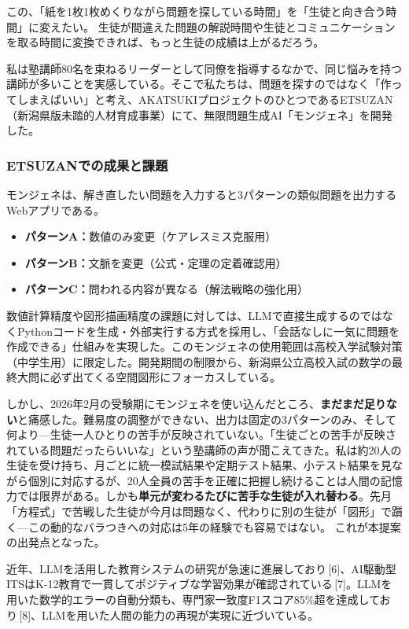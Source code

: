 \documentclass[paper=a4,fontsize=10.5bp,jafontsize=10.5bp,twocolumn]{jlreq}
\begin{document}
この、「紙を1枚1枚めくりながら問題を探している時間」を「生徒と向き合う時間」に変えたい。
生徒が間違えた問題の解説時間や生徒とコミュニケーションを取る時間に変換できれば、もっと生徒の成績は上がるだろう。

私は塾講師80名を束ねるリーダーとして同僚を指導するなかで、同じ悩みを持つ講師が多いことを実感している。そこで私たちは、問題を探すのではなく「作ってしまえばいい」と考え、AKATSUKIプロジェクトのひとつであるETSUZAN（新潟県版未踏的人材育成事業）にて、無限問題生成AI「モンジェネ」を開発した。

\subsubsection{ETSUZANでの成果と課題}

モンジェネは、解き直したい問題を入力すると3パターンの類似問題を出力するWebアプリである。

\begin{itemize}
  \item \textbf{パターンA：}数値のみ変更（ケアレスミス克服用）
  \item \textbf{パターンB：}文脈を変更（公式・定理の定着確認用）
  \item \textbf{パターンC：}問われる内容が異なる（解法戦略の強化用）
\end{itemize}

数値計算精度や図形描画精度の課題に対しては、LLMで直接生成するのではなくPythonコードを生成・外部実行する方式を採用し、「会話なしに一気に問題を作成できる」仕組みを実現した。このモンジェネの使用範囲は高校入学試験対策（中学生用）に限定した。開発期間の制限から、新潟県公立高校入試の数学の最終大問に必ず出てくる空間図形にフォーカスしている。

しかし、2026年2月の受験期にモンジェネを使い込んだところ、\textbf{まだまだ足りない}と痛感した。難易度の調整ができない、出力は固定の3パターンのみ、そして何より---生徒一人ひとりの苦手が反映されていない。「生徒ごとの苦手が反映されている問題だったらいいな」という塾講師の声が聞こえてきた。私は約20人の生徒を受け持ち、月ごとに統一模試結果や定期テスト結果、小テスト結果を見ながら個別に対応するが、20人全員の苦手を正確に把握し続けることは人間の記憶力では限界がある。しかも\textbf{単元が変わるたびに苦手な生徒が入れ替わる}。先月「方程式」で苦戦した生徒が今月は問題なく、代わりに別の生徒が「図形」で躓く---この動的なバラつきへの対応は5年の経験でも容易ではない。 これが本提案の出発点となった。

近年、LLMを活用した教育システムの研究が急速に進展しており\,[6]、AI駆動型ITSはK-12教育で一貫してポジティブな学習効果が確認されている\,[7]。LLMを用いた数学的エラーの自動分類も、専門家一致度F1スコア85\%超を達成しており\,[8]、LLMを用いた人間の能力の再現が実現に近づいている。
\end{document}

